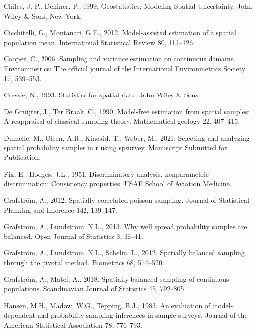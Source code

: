 \documentclass[]{elsarticle} %
\begin{document}
\leavevmode\hypertarget{ref-chiles1999geostatistics}{}%
Chiles, J.-P., Delfiner, P., 1999. Geostatistics: Modeling Spatial
Uncertainty. John Wiley \& Sons, New York.

\leavevmode\hypertarget{ref-cicchitelli2012model}{}%
Cicchitelli, G., Montanari, G.E., 2012. Model-assisted estimation of a
spatial population mean. International Statistical Review 80, 111--126.

\leavevmode\hypertarget{ref-cooper2006sampling}{}%
Cooper, C., 2006. Sampling and variance estimation on continuous
domains. Environmetrics: The official journal of the International
Environmetrics Society 17, 539--553.

\leavevmode\hypertarget{ref-cressie1993statistics}{}%
Cressie, N., 1993. Statistics for spatial data. John Wiley \& Sons.

\leavevmode\hypertarget{ref-de1990model}{}%
De Gruijter, J., Ter Braak, C., 1990. Model-free estimation from spatial
samples: A reappraisal of classical sampling theory. Mathematical
geology 22, 407--415.

\leavevmode\hypertarget{ref-dumelle2021spsurvey}{}%
Dumelle, M., Olsen, A.R., Kincaid, T., Weber, M., 2021. Selecting and
analyzing spatial probability samples in r using spsurvey. Manuscript
Submitted for Publication.

\leavevmode\hypertarget{ref-fix1951discriminatory}{}%
Fix, E., Hodges, J.L., 1951. Discriminatory analysis, nonparametric
discrimination: Consistency properties. USAF School of Aviation
Medicine.

\leavevmode\hypertarget{ref-grafstrom2012spatiallypoisson}{}%
Grafström, A., 2012. Spatially correlated poisson sampling. Journal of
Statistical Planning and Inference 142, 139--147.

\leavevmode\hypertarget{ref-grafstrom2013well}{}%
Grafström, A., Lundström, N.L., 2013. Why well spread probability
samples are balanced. Open Journal of Statistics 3, 36--41.

\leavevmode\hypertarget{ref-grafstrom2012spatially}{}%
Grafström, A., Lundström, N.L., Schelin, L., 2012. Spatially balanced
sampling through the pivotal method. Biometrics 68, 514--520.

\leavevmode\hypertarget{ref-grafstrom2018spatially}{}%
Grafström, A., Matei, A., 2018. Spatially balanced sampling of
continuous populations. Scandinavian Journal of Statistics 45, 792--805.

\leavevmode\hypertarget{ref-hansen1983evaluation}{}%
Hansen, M.H., Madow, W.G., Tepping, B.J., 1983. An evaluation of
model-dependent and probability-sampling inferences in sample surveys.
Journal of the American Statistical Association 78, 776--793.
\end{document}
